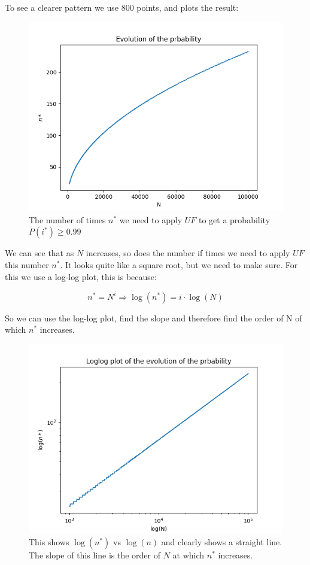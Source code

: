 \documentclass[a4paper,norsk, 10pt]{article}
\begin{document}
To see a clearer pattern we use $800$ points, and plots the result:

\begin{figure}[H]
\centering
\includegraphics[scale=0.5]{pi.png}
\caption{The number of times $n^*$ we need to apply $UF$ to get a probability $P(i^*)\geq 0.99$ }
\end{figure}



We can see that as $N$ increases, so does the number if times we need to apply $UF$ this number $n^*$. It looks quite like a square root, but we need to make sure. For this we use a log-log plot, this is because:

\begin{equation}
n^* = N^i \Rightarrow \log(n^*) = i\cdot \log(N)
\end{equation}

So we can use the log-log plot, find the slope and therefore find the order of N of which $n^*$ increases.


\begin{figure}[H]
\centering
\includegraphics[scale=0.5]{logpi.png}
\caption{This shows $\log(n^*)$ vs $\log(n)$ and clearly shows a straight line. The slope of this line is the order of $N$ at which $n^*$ increases.}
\end{figure}
\end{document}
